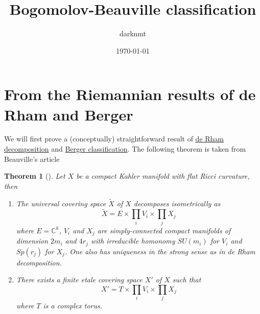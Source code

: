 \documentclass[11pt]{article}
\author{darknmt}
\date{\today}
\title{Bogomolov-Beauville classification}
\newtheorem{theorem}{Theorem}
\begin{document}
\maketitle
\tableofcontents


\section{From the Riemannian results of de Rham and Berger}
\label{sec:org2ff430d}

We will first prove a (conceptually) straightforward result of \href{de-rham-decomposition.org}{de Rham decomposition} and
\href{Berger-remark-complex}{Berger classification}. The following theorem is taken from Beauville's article
\begin{theorem}[]
\label{thm:beauville-1}
\label{org1c1ad60}
Let \(X\) be a compact Kahler manifold with flat Ricci curvature, then
\begin{enumerate}
\item The universal covering space \(\tilde X\) of \(X\) decomposes isometrically as \[\tilde X =
   E \times\prod_i V_i\times \prod_j X_j\] where \(E = \mathbb{C}^k\), \(V_i\) and \(X_j\) are simply-connected
compact manifolds of dimension \(2m_i\) and \(4r_j\) with irreducible homonomy \(SU(m_i)\) for \(V_i\) and \(Sp(r_j)\) for \(X_j\). One
also has uniqueness in the strong sense as in de Rham decomposition.
\item There exists a finite etale covering space \(X'\) of \(X\) such that \[ X' = T\times \prod_i V_i
   \times \prod_j X_j\] where \(T\) is a complex torus.
\end{enumerate}
\end{theorem}
\end{document}
